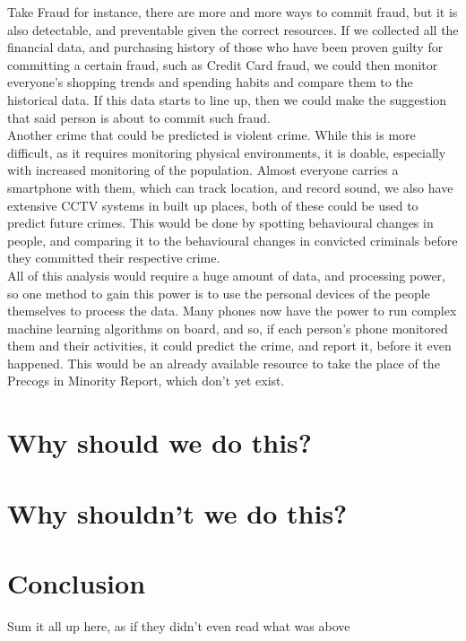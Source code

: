 \documentclass[12pt]{amsart}
\begin{document}
    Take Fraud for instance, there are more and more ways to commit fraud, but it is also detectable, and preventable
    given the correct resources.
    If we collected all the financial data, and purchasing history of those who have been proven guilty for
    committing a certain fraud, such as Credit Card fraud, we could then monitor everyone's shopping trends and spending
    habits and compare them to the historical data.
    If this data starts to line up, then we could make the suggestion that said person is about to commit such fraud.
    \\

    Another crime that could be predicted is violent crime.
    While this is more difficult, as it requires monitoring physical environments, it is doable, especially with
    increased monitoring of the population.
    Almost everyone carries a smartphone with them, which can track location, and record sound, we also have extensive
    CCTV systems in built up places, both of these could be used to predict future crimes.
    This would be done by spotting behavioural changes in people, and comparing it to the behavioural changes in
    convicted criminals before they committed their respective crime.
    \\

    All of this analysis would require a huge amount of data, and processing power, so one method to gain this power
    is to use the personal devices of the people themselves to process the data.
    Many phones now have the power to run complex machine learning algorithms on board, and so, if each person's phone
    monitored them and their activities, it could predict the crime, and report it, before it even happened.
    This would be an already available resource to take the place of the Precogs in Minority Report, which don't yet
    exist.

    \section{Why should we do this?}\label{sec:why-should-we-do-this?}
    

    \section{Why shouldn't we do this?}\label{sec:why-shouldn't-we-do-this?}
    

    \section{Conclusion}\label{sec:conclusion}  %

    Sum it all up here, as if they didn't even read what was above ~\cite{mr-book}

    {}
    
\end{document}
